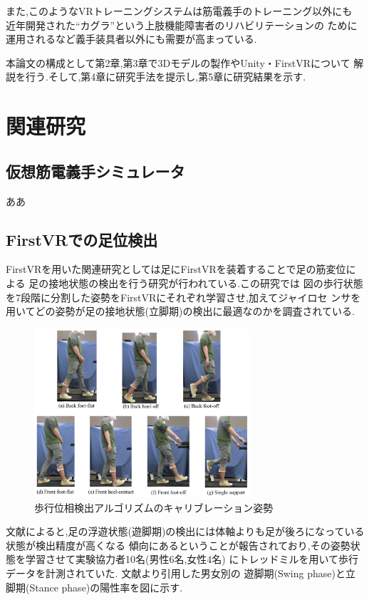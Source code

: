 \documentclass{ltjsreport}
\begin{document}
		また,このようなVRトレーニングシステムは筋電義手のトレーニング以外にも
		近年開発された``カグラ''\cite{ref:5}という上肢機能障害者のリハビリテーションの
		ために運用されるなど義手装具者以外にも需要が高まっている.

		本論文の構成として第2章,第3章で3Dモデルの製作やUnity・FirstVRについて
		解説を行う.そして,第4章に研究手法を提示し,第5章に研究結果を示す.

	\section{関連研究}
		\subsection{仮想筋電義手シミュレータ}
			ああ
		\subsection{FirstVRでの足位検出}
		FirstVRを用いた関連研究としては足にFirstVRを装着することで足の筋変位による
		足の接地状態の検出を行う研究\cite{ref:6}が行われている.この研究では
		図の歩行状態を7段階に分割した姿勢をFirstVRにそれぞれ学習させ,加えてジャイロセ
		ンサを用いてどの姿勢が足の接地状態(立脚期)の検出に最適なのかを調査されている.
		\begin{figure}[H]
		\centering
		\includegraphics[width = 8cm]{../figs/sensors-21-01081-g004.jpg}
		\hspace{-32truemm}
		\caption{歩行位相検出アルゴリズムのキャリブレーション姿勢}
		\label{fig:RR-FVRcalibration}
		\end{figure}

		文献\cite{ref:6}によると,足の浮遊状態(遊脚期)の検出には体軸よりも足が後ろになっている状態が検出精度が高くなる
		傾向にあるということが報告されており,その姿勢状態を学習させて実験協力者10名(男性6名,女性4名)
		にトレッドミルを用いて歩行データを計測されていた.
\clearpage
		文献\cite{ref:6}より引用した男女別の
		遊脚期(Swing phase)と立脚期(Stance phase)の陽性率を図に示す.
\end{document}
